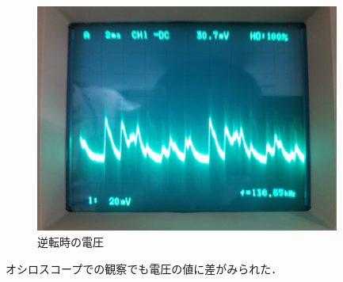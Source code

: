 \begin{figure}[htbp]
 \begin{center}
    \includegraphics[width=100mm]{img/osiro_gyakuten.jpg}
    \end{center}
  \caption{逆転時の電圧}
 \label{fig:osiro_gyakuten}
\end{figure}







オシロスコープでの観察でも電圧の値に差がみられた．
